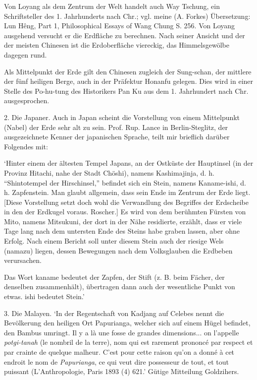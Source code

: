 \documentclass[a4paper, 11pt, oneside]{article}
\begin{document}
Von Loyang als dem Zentrum der Welt handelt auch Way Tschung, ein Schriftsteller des 1. Jahrhunderts nach Chr.; vgl. meine (A. Forkes) Übersetzung: Lun Hêng, Part 1, Philosophical Essays of Wang Chung S. 256. Von Loyang ausgehend versucht er die Erdfläche zu berechnen. Nach seiner Ansicht und der der meisten Chinesen ist die Erdoberfläche viereckig, das Himmelsgewölbe dagegen rund.

Als Mittelpunkt der Erde gilt den Chinesen zugleich der Sung-schan, der mittlere der fünf heiligen Berge, auch in der Präfektur Honanfu gelegen. Dies wird in einer Stelle des Po-hu-tung des Historikers Pan Ku aus dem 1. Jahrhundert nach Chr. ausgesprochen.

2. Die Japaner. Auch in Japan scheint die Vorstellung von einem Mittelpunkt (Nabel) der Erde sehr alt zu sein. Prof. Rup. Lance in Berlin-Steglitz, der ausgezeichnete Kenner der japanischen Sprache, teilt mir brieflich darüber Folgendes mit:

`Hinter einem der ältesten Tempel Japans, an der Ostküste der Hauptinsel (in der Provinz Hitachi, nahe der Stadt Chöshi), namens Kashimajinja, d. h. "`Shintotempel der Hirschinsel,"' befindet sich ein Stein, namens Kaname-ishi, d. h. Zapfenstein. Man glaubt allgemein, dass sein Ende im Zentrum der Erde liegt. [Diese Vorstellung setzt doch wohl die Verwandlung des Begriffes der Erdscheibe in den der Erdkugel voraus. Roscher.] Es wird von dem berühmten Fürsten von Mito, namens Mitsukuni, der dort in der Nähe residierte, erzählt, dass er viele Tage lang nach dem untersten Ende des Steins habe graben lassen, aber ohne Erfolg. Nach einem Bericht soll unter diesem Stein auch der riesige Wels (namazu) liegen, dessen Bewegungen nach dem Volksglauben die Erdbeben verursachen.

Das Wort kaname bedeutet der Zapfen, der Stift (z. B. beim Fächer, der denselben zusammenhält), übertragen dann auch der wesentliche Punkt von etwas. ishi bedeutet Stein.'

3. Die Malayen. `In der Regentschaft von Kadjang auf Celebes nennt die Bevölkerung den heiligen Ort Papurianga, welcher sich auf einem Hügel befindet, den Bambus umringt. Il y a là une fosse de grandes dimensions... on l'appelle \emph{potgi-tanah} (le nombril de la terre), nom qui est rarement prononcé par respect et par crainte de quelque malheur. C'est pour cette raison qu'on a donné à cet endroit le nom de \emph{Papurianga}, ce qui veut dire possesseur de tout, et tout puissant (L'Anthropologie, Paris 1893 (4) 621.' Gütige Mitteilung Goldzihers.
\end{document}
